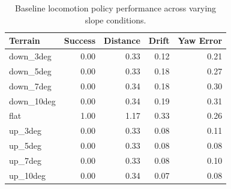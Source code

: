 \begin{table}[h]
\centering
\begin{tabular}{lrrrr}
\hline
Terrain & Success & Distance & Drift & Yaw Error \\
\hline
down_3deg & 0.00 & 0.33 & 0.12 & 0.21 \\
down_5deg & 0.00 & 0.33 & 0.18 & 0.27 \\
down_7deg & 0.00 & 0.34 & 0.18 & 0.30 \\
down_10deg & 0.00 & 0.34 & 0.19 & 0.31 \\
flat & 1.00 & 1.17 & 0.33 & 0.26 \\
up_3deg & 0.00 & 0.33 & 0.08 & 0.11 \\
up_5deg & 0.00 & 0.33 & 0.08 & 0.08 \\
up_7deg & 0.00 & 0.33 & 0.08 & 0.10 \\
up_10deg & 0.00 & 0.34 & 0.07 & 0.08 \\
\hline
\end{tabular}
\caption{Baseline locomotion policy performance across varying slope conditions.}
\label{tab:baseline_slope_results}
\end{table}
